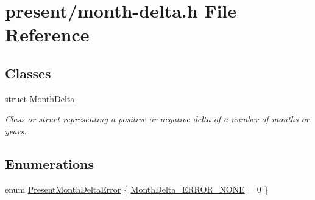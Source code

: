 \hypertarget{month-delta_8h}{\section{present/month-\/delta.h \-File \-Reference}
\label{month-delta_8h}
}
\subsection*{\-Classes}
\begin{DoxyCompactItemize}
\item 
struct \hyperlink{structMonthDelta}{\-Month\-Delta}
\begin{DoxyCompactList}\small\item\em \-Class or struct representing a positive or negative delta of a number of months or years. \end{DoxyCompactList}\end{DoxyCompactItemize}
\subsection*{\-Enumerations}
\begin{DoxyCompactItemize}
\item 
enum \hyperlink{month-delta_8h_aee28c4c9b4054448713e954a7944cb51}{\-Present\-Month\-Delta\-Error} \{ \hyperlink{month-delta_8h_aee28c4c9b4054448713e954a7944cb51a880d48faec79524a948ad81b1ab2e87e}{\-Month\-Delta\-\_\-\-E\-R\-R\-O\-R\-\_\-\-N\-O\-N\-E} =  0
 \}
\end{DoxyCompactItemize}
